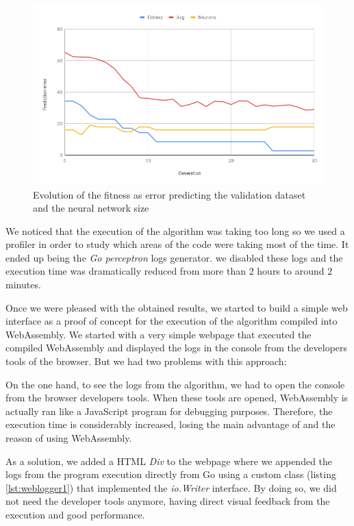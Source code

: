 \begin{figure}[h!]
		\centering
    	\includegraphics[width=\linewidth]{assets/images/milestone1-native-chart.png}
    	\caption{Evolution of the fitness as error predicting the validation dataset and the neural network size}
    	\label{fig:native}
\end{figure} 

We noticed that the execution of the algorithm was taking too long so we used a profiler in order to study which areas of the code were taking most of the time. It ended up being the \textit{Go perceptron} logs generator. we disabled these logs and the execution time was dramatically reduced from more than 2 hours to around 2 minutes.

Once we were pleased with the obtained results, we started to build a simple web interface as a proof of concept for the execution of the algorithm compiled into WebAssembly. We started with a very simple webpage that executed the compiled WebAssembly and displayed the logs in the console from the developers tools of the browser. But we had two problems with this approach:

On the one hand, to see the logs from the algorithm, we had to open the console from the browser developers tools. When these tools are opened, WebAssembly is actually ran like a JavaScript program for debugging purposes. Therefore, the execution time is considerably increased, losing the main advantage of and the reason of using WebAssembly.

As a solution, we added a HTML \textit{Div} to the webpage where we appended the logs from the program execution directly from Go using a custom class (listing \ref{lst:weblogger1}) that implemented the \textit{io.Writer} interface. By doing so, we did not need the developer tools anymore, having direct visual feedback from the execution and good performance.

